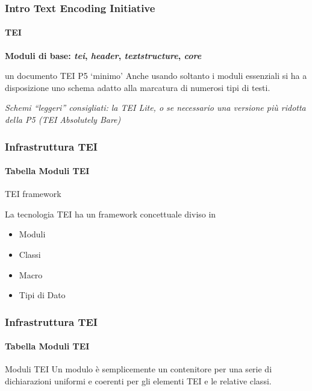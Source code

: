 \begin{frame}
	\frametitle{Intro Text Encoding Initiative}
	\framesubtitle{TEI}
	\addtocounter{nframe}{1}

   \textbf{ Moduli di base: \textit{tei}, \textit{header}, \textit{textstructure}, \textit{core}}

	\begin{block}{un documento TEI P5 ‘minimo’}
        Anche usando soltanto i moduli essenziali si ha a disposizione
        uno schema adatto alla marcatura di numerosi tipi di testi.
    \end{block}
 
       \textit{Schemi ``leggeri'' consigliati: la TEI Lite, o se necessario una
        versione più ridotta della P5 (TEI
        Absolutely Bare)}
\end{frame}





\begin{frame}
    \frametitle{Infrastruttura TEI}
    \framesubtitle{Tabella Moduli TEI}
    \addtocounter{nframe}{1}
    
    \begin{block}{TEI framework}
        
            La tecnologia TEI ha un framework concettuale diviso in
                \begin{itemize}
                    \item Moduli
                    \item Classi
                    \item Macro
                    \item Tipi di Dato
                \end{itemize}

    \end{block}
\end{frame}


\begin{frame}
    \frametitle{Infrastruttura TEI}
    \framesubtitle{Tabella Moduli TEI}
    \addtocounter{nframe}{1}
    
    \begin{block}{Moduli TEI}
        Un modulo è semplicemente un contenitore per una serie di dichiarazioni uniformi e coerenti per gli elementi TEI e le relative classi.
    \end{block}
\end{frame}

